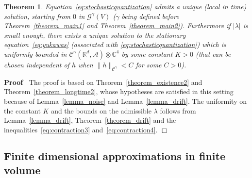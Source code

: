 \documentclass{article}
\newenvironment{proof}{\noindent\textbf{Proof\ }}{\hspace*{\fill}$\Box$\medskip}
\newtheorem{theorem}{Theorem}
\begin{document}
\begin{theorem}
  \label{theorem_main3}Equation~{\eqref{eq:stochasticquantization}} admits a
  unique (local in time) solution, starting from $0$ in $\mathcal{G}^{\gamma}
  (V)$ ($\gamma$ being defined before Theorem~\ref{theorem_main1} and
  Theorem~\ref{theorem_main2}). Furthermore if $| \lambda |$ is small enough,
  there exists a unique solution to the stationary
  equation~{\eqref{eq:yukawas}} (associated with
  {\eqref{eq:stochasticquantization}}) which is uniformly bounded in
  $\mathcal{C}^{\gamma} (\mathbb{R}^d, \mathcal{A}) \otimes \mathbb{C}^4$ by
  some constant $K > 0$ (that can be chosen independent of $h$ when $\| h
  \|_{\mathcal{C}^{\gamma}} < C$ for some $C > 0$).
\end{theorem}

\begin{proof}
  The proof is based on Theorem~\ref{theorem_existence2} and
  Theorem~\ref{theorem_longtime2}, whose hypotheses are satisfied in this
  setting because of Lemma~\ref{lemma_noise} and Lemma~\ref{lemma_drift}. The
  uniformity on the constant $K$ and the bounds on the admissible $\lambda$
  follows from Lemma~\ref{lemma_drift}, Theorem~\ref{theorem_drift} and the
  inequalities~{\eqref{eq:contraction3}} and~{\eqref{eq:contraction4}}.
\end{proof}

\subsection{Finite dimensional approximations in finite
volume}\label{sec:finit-dim-yukawa}
\end{document}
